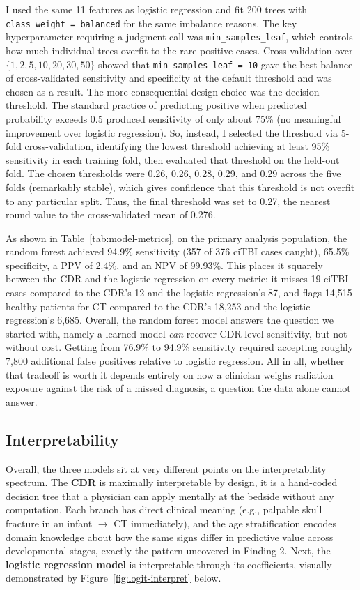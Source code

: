 \documentclass[11pt,letterpaper]{article}
\begin{document}
I used the same 11 features as logistic regression and fit 200 trees with \texttt{class\_weight = balanced} for the same imbalance reasons. The key hyperparameter requiring a judgment call was \texttt{min\_samples\_leaf}, which controls how much individual trees overfit to the rare positive cases. Cross-validation over $\{1, 2, 5, 10, 20, 30, 50\}$ showed that \texttt{min\_samples\_leaf = 10} gave the best balance of cross-validated sensitivity and specificity at the default threshold and was chosen as a result. The more consequential design choice was the decision threshold. The standard practice of predicting positive when predicted probability exceeds 0.5 produced sensitivity of only about 75\% (no meaningful improvement over logistic regression). So, instead, I selected the threshold via 5-fold cross-validation, identifying the lowest threshold achieving at least 95\% sensitivity in each training fold, then evaluated that threshold on the held-out fold. The chosen thresholds were 0.26, 0.26, 0.28, 0.29, and 0.29 across the five folds (remarkably stable), which gives confidence that this threshold is not overfit to any particular split. Thus, the final threshold was set to 0.27, the nearest round value to the cross-validated mean of 0.276. 

As shown in Table~\ref{tab:model-metrics}, on the primary analysis population, the random forest achieved 94.9\% sensitivity (357 of 376 ciTBI cases caught), 65.5\% specificity, a PPV of 2.4\%, and an NPV of 99.93\%. This places it squarely between the CDR and the logistic regression on every metric: it misses 19 ciTBI cases compared to the CDR's 12 and the logistic regression's 87, and flags 14,515 healthy patients for CT compared to the CDR's 18,253 and the logistic regression's 6,685. Overall, the random forest model answers the question we started with, namely a learned model \textit{can} recover CDR-level sensitivity, but not without cost. Getting from 76.9\% to 94.9\% sensitivity required accepting roughly 7,800 additional false positives relative to logistic regression. All in all, whether that tradeoff is worth it depends entirely on how a clinician weighs radiation exposure against the risk of a missed diagnosis, a question the data alone cannot answer.

\subsection{Interpretability}

Overall, the three models sit at very different points on the interpretability spectrum. The \textbf{CDR} is maximally interpretable by design, it is a hand-coded decision tree that a physician can apply mentally at the bedside without any computation. Each branch has direct clinical meaning (e.g., palpable skull fracture in an infant $\rightarrow$ CT immediately), and the age stratification encodes domain knowledge about how the same signs differ in predictive value across developmental stages, exactly the pattern uncovered in Finding 2. Next, the \textbf{logistic regression model} is interpretable through its coefficients, visually demonstrated by Figure~\ref{fig:logit-interpret} below. 
\end{document}
